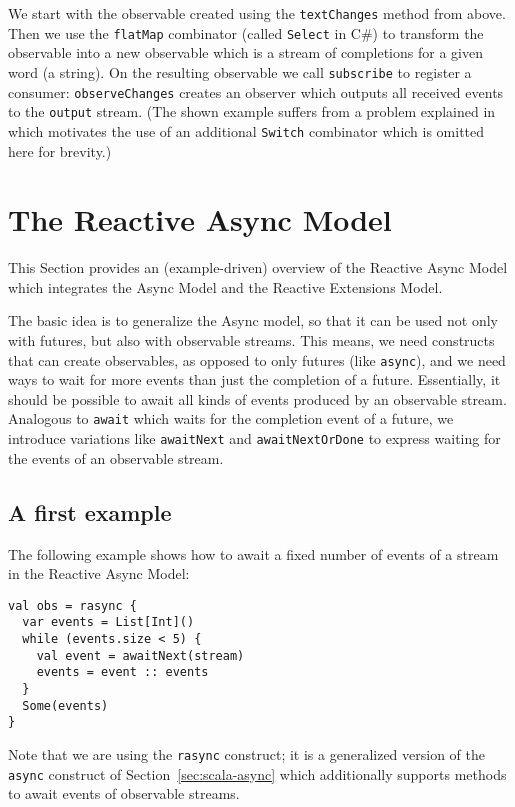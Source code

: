 \documentclass{acm_proc_article-sp}
\begin{document}
We start with the observable created using the \verb|textChanges| method from
above. Then we use the \verb|flatMap| combinator (called \verb|Select| in C\#)
to transform the observable into a new observable which is a stream of
completions for a given word (a string). On the resulting observable we call
\verb|subscribe| to register a consumer: \verb|observeChanges| creates an
observer which outputs all received events to the \verb|output| stream. (The
shown example suffers from a problem explained in~\cite{RxCACM} which
motivates the use of an additional \verb|Switch| combinator which is omitted
here for brevity.)


\section{The Reactive Async Model}

This Section provides an (example-driven) overview of the Reactive Async Model
which integrates the Async Model and the Reactive Extensions Model.

The basic idea is to generalize the Async model, so that it can be used not
only with futures, but also with observable streams. This means, we need
constructs that can create observables, as opposed to only futures (like
\verb|async|), and we need ways to wait for more events than just the
completion of a future. Essentially, it should be possible to await all kinds
of events produced by an observable stream. Analogous to \verb|await| which
waits for the completion event of a future, we introduce variations like
\verb|awaitNext| and \verb|awaitNextOrDone| to express waiting for the events
of an observable stream.

\subsection{A first example}

The following example shows how to await a fixed number of events of a stream
in the Reactive Async Model:

\begin{lstlisting}
val obs = rasync {
  var events = List[Int]()
  while (events.size < 5) {
    val event = awaitNext(stream)
    events = event :: events
  }
  Some(events)
}
\end{lstlisting}

Note that we are using the \verb|rasync| construct; it is a generalized
version of the \verb|async| construct of Section~\ref{sec:scala-async} which
additionally supports methods to await events of observable streams.
\end{document}
